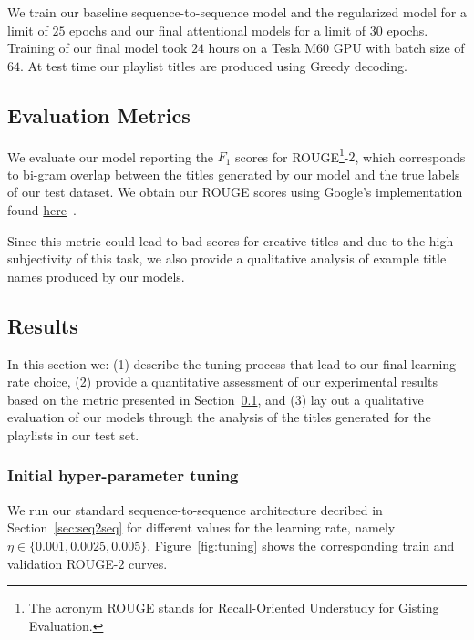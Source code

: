 \documentclass{article} %
\begin{document}
We train our baseline sequence-to-sequence model and the regularized model for a limit of $25$ epochs and our final attentional models for a limit of $30$ epochs. 
Training of our final model took $24$ hours on a Tesla M60 GPU with batch size of $64$. At test time our playlist titles are produced using Greedy decoding.

\subsection{Evaluation Metrics}
\label{sec:metric}

We evaluate our model reporting the $F_1$ scores for ROUGE\footnote{The acronym ROUGE stands for Recall-Oriented Understudy for Gisting Evaluation.}-$2$, which corresponds to bi-gram overlap between the titles generated by our model and the true labels of our test dataset. 
We obtain our ROUGE scores using Google's implementation found \href{https://github.com/google/seq2seq/blob/master/seq2seq/metrics/rouge.py}{here}~\cite{Britz:2017}.

Since this metric could lead to bad scores for creative titles and due to the high subjectivity of this task, we also provide a qualitative analysis of example title names produced by our models.

\subsection{Results}
\label{sec:results}
In this section we: (1) describe the tuning process that lead to our final learning rate choice, (2) provide a quantitative assessment of our experimental results based on the metric presented in Section~\ref{sec:metric}, and (3) lay out a qualitative evaluation of our models through the analysis of the titles generated for the playlists in our test set.  

\subsubsection{Initial hyper-parameter tuning}
We run our standard sequence-to-sequence architecture decribed in Section~\ref{sec:seq2seq} for different values for the learning rate, namely $\eta \in \{0.001, 0.0025, 0.005\}$. 
Figure~\ref{fig:tuning} shows the corresponding train and validation ROUGE-$2$ curves.   
\end{document}
